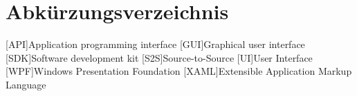 \chapter{Abkürzungsverzeichnis}
\begin{acronym}[XAML]
[API]{Application programming interface}
[GUI]{Graphical user interface}
[SDK]{Software development kit}
[S2S]{Source-to-Source}
[UI]{User Interface}
[WPF]{Windows Presentation Foundation}
[XAML]{Extensible Application Markup Language}
\end{acronym}
